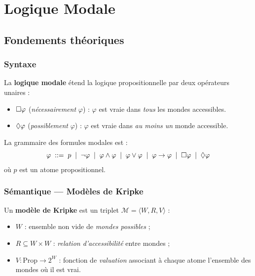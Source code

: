 \chapter{Logique Modale}

\section{Fondements théoriques}

\subsection{Syntaxe}

La \textbf{logique modale} étend la logique propositionnelle par deux opérateurs
unaires :

\begin{itemize}
  \item $\Box\varphi$ (\emph{nécessairement} $\varphi$) : $\varphi$ est vraie
        dans \emph{tous} les mondes accessibles.
  \item $\Diamond\varphi$ (\emph{possiblement} $\varphi$) : $\varphi$ est vraie
        dans \emph{au moins un} monde accessible.
\end{itemize}

\noindent La grammaire des formules modales est :
\[
  \varphi \;::=\; p \;\mid\; \lnot\varphi \;\mid\; \varphi \land \varphi
           \;\mid\; \varphi \lor \varphi \;\mid\; \varphi \to \varphi
           \;\mid\; \Box\varphi \;\mid\; \Diamond\varphi
\]
où $p$ est un atome propositionnel.

\subsection{Sémantique — Modèles de Kripke}

Un \textbf{modèle de Kripke} est un triplet $\mathcal{M} = \langle W, R, V \rangle$ :

\begin{itemize}
  \item $W$ : ensemble non vide de \emph{mondes possibles} ;
  \item $R \subseteq W \times W$ : \emph{relation d'accessibilité} entre mondes ;
  \item $V : \mathrm{Prop} \to 2^W$ : fonction de \emph{valuation} associant à
        chaque atome l'ensemble des mondes où il est vrai.
\end{itemize}

